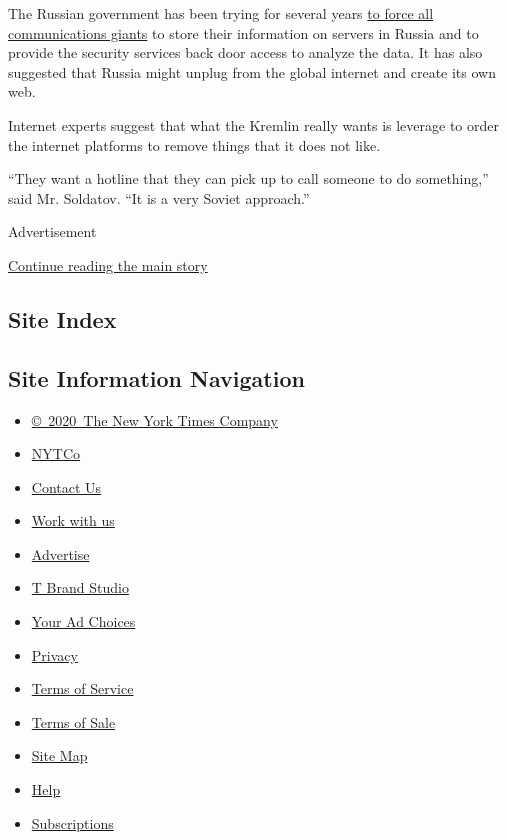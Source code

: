 The Russian government has been trying for several years
\href{https://www.nytimes.com/2016/12/06/world/europe/russia-putin-cyberattacks.html}{to
force all communications giants} to store their information on servers
in Russia and to provide the security services back door access to
analyze the data. It has also suggested that Russia might unplug from
the global internet and create its own web.

Internet experts suggest that what the Kremlin really wants is leverage
to order the internet platforms to remove things that it does not like.

``They want a hotline that they can pick up to call someone to do
something,'' said Mr. Soldatov. ``It is a very Soviet approach.''

Advertisement

\protect\hyperlink{after-bottom}{Continue reading the main story}

\hypertarget{site-index}{%
\subsection{Site Index}\label{site-index}}

\hypertarget{site-information-navigation}{%
\subsection{Site Information
Navigation}\label{site-information-navigation}}

\begin{itemize}
\tightlist
\item
  \href{https://help.nytimes.com/hc/en-us/articles/115014792127-Copyright-notice}{©~2020~The
  New York Times Company}
\end{itemize}

\begin{itemize}
\tightlist
\item
  \href{https://www.nytco.com/}{NYTCo}
\item
  \href{https://help.nytimes.com/hc/en-us/articles/115015385887-Contact-Us}{Contact
  Us}
\item
  \href{https://www.nytco.com/careers/}{Work with us}
\item
  \href{https://nytmediakit.com/}{Advertise}
\item
  \href{http://www.tbrandstudio.com/}{T Brand Studio}
\item
  \href{https://www.nytimes.com/privacy/cookie-policy\#how-do-i-manage-trackers}{Your
  Ad Choices}
\item
  \href{https://www.nytimes.com/privacy}{Privacy}
\item
  \href{https://help.nytimes.com/hc/en-us/articles/115014893428-Terms-of-service}{Terms
  of Service}
\item
  \href{https://help.nytimes.com/hc/en-us/articles/115014893968-Terms-of-sale}{Terms
  of Sale}
\item
  \href{https://spiderbites.nytimes.com}{Site Map}
\item
  \href{https://help.nytimes.com/hc/en-us}{Help}
\item
  \href{https://www.nytimes.com/subscription?campaignId=37WXW}{Subscriptions}
\end{itemize}
